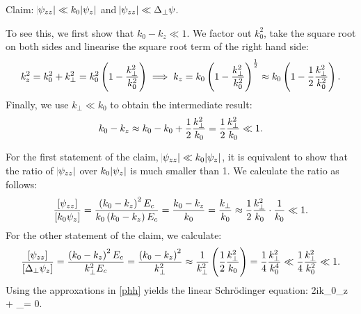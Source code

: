 Claim: $\abs{\psi_{zz}}\ll k_0\abs{\psi_z}$ and 
$\abs{\psi_{zz}}\ll \Delta_\perp\psi$. 

\revgroup To see this, we first show that $k_0-k_z \ll 1$.  We factor out $k_0^2$, take the
square root on both sides and linearise the square root term of the right hand
side: 
$$ k_z^2=k_0^2+k_\perp^2=k_0^2\left(1-\frac{k_\perp^2}{k_0^2}\right)
\implies
k_z=k_0\left(1-\frac{k_\perp^2}{k_0^2}\right)^\frac{1}{2}
\approx k_0\left(1-\frac{1}{2}\frac{k_\perp^2}{k_0^2}\right). $$
Finally, we use $k_\perp\ll k_0$ to obtain the intermediate result:
$$ k_0-k_z \approx k_0 - k_0 + \frac{1}{2}\frac{k_\perp^2}{k_0}=
\frac{1}{2}\frac{k_\perp^2}{k_0}\ll1. $$

For the first statement of the claim, $\abs{\psi_{zz}}\ll k_0\abs{\psi_z}$, it is equivalent
to show that the ratio of $\abs{\psi_{zz}}$ over $k_0\abs{\psi_z}$ is much smaller than 1. 
We calculate the ratio as follows:
$$
\frac{\left[\psi_{zz}\right]}{\left[k_0\psi_z\right]}=
\frac{\left(k_0-k_z\right)^2 E_c}{k_0\left(k_0-k_z\right)E_c}=
\frac{k_0-k_z}{k_0}=\frac{k_\perp}{k_0}\approx
\frac{1}{2}\frac{k_\perp^2}{k_0}\cdot\frac{1}{k_0}\ll1.
$$
For the other statement of the claim, we calculate:
$$
\frac{\left[\psi_{zz}\right]}{\left[\Delta_\perp\psi_z\right]}=
\frac{\left(k_0-k_z\right)^2 E_c}{k_\perp^2 E_c}=
\frac{\left(k_0-k_z\right)^2}{k_\perp^2}\approx
\frac{1}{k_\perp^2}\left(\frac{1}{2}\frac{k_\perp^2}{k_0}\right)=
\frac{1}{4}\frac{k_\perp^2}{k_0^4}\ll\frac{1}{4}\frac{k_\perp^2}{k_0^2}\ll1.
$$
\endgroup
Using the approxations in \cref{phh} yields the
linear Schr\"odinger equation:
\be \label{lse}
2ik_0\psi_z + \Delta_\perp\psi = 0.
\ee

